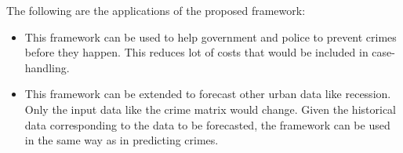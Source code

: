 The following are the applications of the proposed framework:

\begin{itemize}
    \item This framework can be used to help government and police to prevent crimes
    before they happen. This reduces lot of costs that would be included in 
    case-handling.
    \item This framework can be extended to forecast other urban data like 
    recession. Only the input data like the crime matrix would change. Given
    the historical data corresponding to the data to be forecasted, the framework
    can be used in the same way as in predicting crimes.
\end{itemize}


